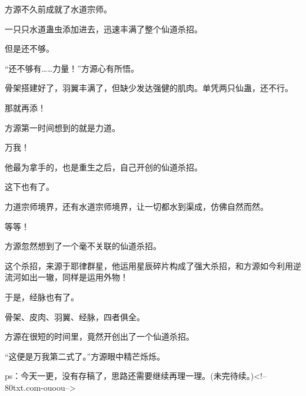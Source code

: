 \begin{this_body}
方源不久前成就了水道宗师。

一只只水道蛊虫添加进去，迅速丰满了整个仙道杀招。

但是还不够。

“还不够有……力量！”方源心有所悟。

骨架搭建好了，羽翼丰满了，但缺少发达强健的肌肉。单凭两只仙蛊，还不行。

那就再添！

方源第一时间想到的就是力道。

万我！

他最为拿手的，也是重生之后，自己开创的仙道杀招。

这下也有了。

力道宗师境界，还有水道宗师境界，让一切都水到渠成，仿佛自然而然。

等等！

方源忽然想到了一个毫不关联的仙道杀招。

这个杀招，来源于耶律群星，他运用星辰碎片构成了强大杀招，和方源如今利用逆流河如出一辙，同样是运用外物！

于是，经脉也有了。

骨架、皮肉、羽翼、经脉，四者俱全。

方源在很短的时间里，竟然开创出了一个仙道杀招。

“这便是万我第二式了。”方源眼中精芒烁烁。

ps：今天一更，没有存稿了，思路还需要继续再理一理。(未完待续。)<!--80txt.com-ouoou-->

\end{this_body}


